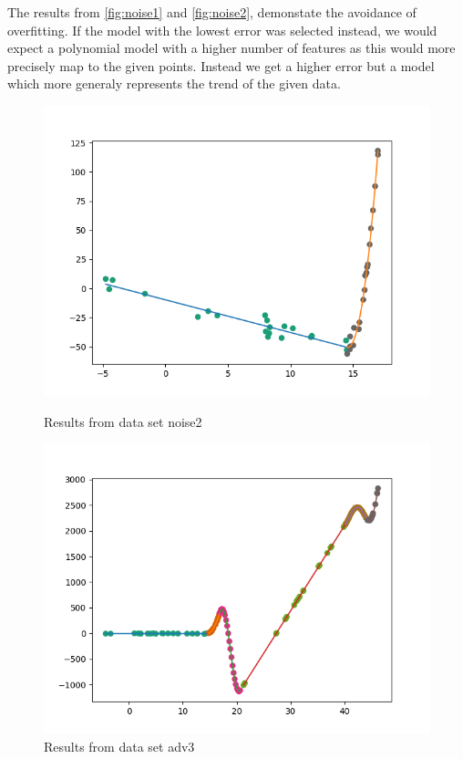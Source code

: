 \documentclass[]{article}
\begin{document}
  The results from \ref{fig:noise1} and \ref{fig:noise2}, demonstate the avoidance of overfitting. If
  the model with the lowest error was selected instead, we would expect a polynomial model with
  a higher number of features as this would more precisely map to the given points. Instead we get a higher error but a model which
  more generaly represents the trend of the given data.

\begin{figure}[!htb]
  \centering
  \begin{minipage}[b]{0.45\textwidth}
    \includegraphics[width=\textwidth]{noise2.png}
    \caption {Results from data set noise2}
    \label{fig:noise2}
  \end{minipage}
  \hfill
  \begin{minipage}[b]{0.45\textwidth}
    \includegraphics[width=\textwidth]{adv3.png}
    \caption {Results from data set adv3}
    \label{fig:adv3}
  \end{minipage}

\end{figure}
\end{document}
